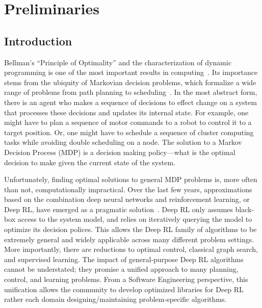 \setcounter{secnumdepth}{0}
\chapter{Preliminaries}
\section{Introduction}
Bellman's ``Principle of Optimality'' and the characterization of dynamic programming is one of the most important results in computing~\cite{bellman2013dynamic}. Its importance stems from the ubiquity of Markovian decision problems, which formalize a wide range of problems from path planning to scheduling~\cite{howard1966dynamic}. In the most abstract form, there is an agent who makes a sequence of decisions to effect change on a system that processes these decisions and updates its internal state. For example, one might have to plan a sequence of motor commands to a robot to control it to a target position. Or, one might have to schedule a sequence of cluster computing tasks while avoiding double scheduling on a node. 
The solution to a Markov Decision Process (MDP) is a decision making policy---what is the optimal decision to make given the current state of the system. 

Unfortunately, finding optimal solutions to general MDP problems is, more often than not, computationally impractical. Over the last few years, approximations based on the combination deep neural networks and reinforcement learning, or Deep RL, have emerged as a pragmatic solution~\cite{mnih2015human,silver2017mastering}. Deep RL only assumes black-box access to the system model, and relies on iteratively querying the model to optimize its decision polices. This allows the Deep RL family of algorithms to be extremely general and widely applicable across many different problem settings. More importantly, there are reductions to optimal control, classical graph search, and supervised learning. The impact of general-purpose Deep RL algorithms cannot be understated; they promise a unified approach to many planning, control, and learning problems. 
From a Software Engineering perspective, this unification allows the community to develop optimized libraries for Deep RL rather each domain designing/maintaining problem-specific algorithms.

